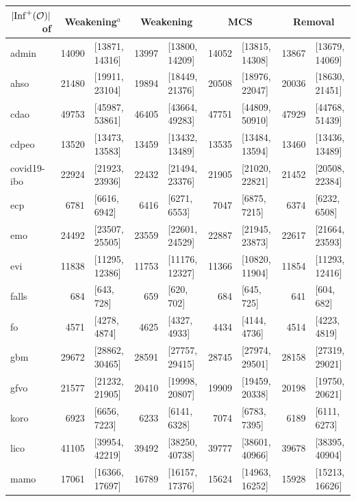 \begin{table}[ht]
  \scriptsize
  \centering
  \begin{tabular}{|l|r@{ }lr@{ }lr@{ }lr@{ }l|}
    \cline{2-9}
    \multicolumn{1}{r|}{$|{\operatorname{Inf}}^+(\mathcal{O})|$ of} & \multicolumn{2}{c}{Weakening$^a$} & \multicolumn{2}{c}{Weakening} & \multicolumn{2}{c}{MCS} & \multicolumn{2}{c|}{Removal} \\
    \hline
    admin & 14090 & [13871, 14316] & 13997 & [13800, 14209] & 14052 & [13815, 14308] & 13867 & [13679, 14069] \\
    ahso & 21480 & [19911, 23104] & 19894 & [18449, 21376] & 20508 & [18976, 22047] & 20036 & [18630, 21451] \\
    cdao & 49753 & [45987, 53861] & 46405 & [43664, 49283] & 47751 & [44809, 50910] & 47929 & [44768, 51439] \\
    cdpeo & 13520 & [13473, 13583] & 13459 & [13432, 13489] & 13535 & [13484, 13594] & 13460 & [13436, 13489] \\
    covid19-ibo & 22924 & [21923, 23936] & 22432 & [21494, 23376] & 21905 & [21020, 22821] & 21452 & [20508, 22384] \\
    ecp & 6781 & [6616, 6942] & 6416 & [6271, 6553] & 7047 & [6875, 7215] & 6374 & [6232, 6508] \\
    emo & 24492 & [23507, 25505] & 23559 & [22601, 24529] & 22887 & [21945, 23873] & 22617 & [21664, 23593] \\
    evi & 11838 & [11295, 12386] & 11753 & [11176, 12327] & 11366 & [10820, 11904] & 11854 & [11293, 12416] \\
    falls & 684 & [643, 728] & 659 & [620, 702] & 684 & [645, 725] & 641 & [604, 682] \\
    fo & 4571 & [4278, 4874] & 4625 & [4327, 4933] & 4434 & [4144, 4736] & 4514 & [4223, 4819] \\
    gbm & 29672 & [28862, 30465] & 28591 & [27757, 29415] & 28745 & [27974, 29501] & 28158 & [27319, 29021] \\
    gfvo & 21577 & [21232, 21905] & 20410 & [19998, 20807] & 19909 & [19459, 20338] & 20198 & [19750, 20621] \\
    koro & 6923 & [6656, 7223] & 6233 & [6141, 6328] & 7074 & [6783, 7395] & 6189 & [6111, 6273] \\
    lico & 41105 & [39954, 42219] & 39492 & [38250, 40738] & 39777 & [38601, 40966] & 39678 & [38395, 40904] \\
    mamo & 17061 & [16366, 17697] & 16789 & [16157, 17376] 
    & 15624 & [14963, 16252] & 15928 & [15213, 16626] \\

\end{tabular}
\end{table}
